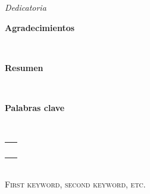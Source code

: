 \documentclass[11pt,a4paper,titlepage,twoside,openright]{report}
\begin{document}
\begin{titlepage}
\hfill \emph{Dedicatoria}
\end{titlepage}
\cleardoublepage


\begin{titlepage}
\vspace{2cm}
\begin{Huge}{\bf Agradecimientos}\end{Huge}\\
\newline



\end{titlepage}
\cleardoublepage


\begin{titlepage}
\vspace{2cm}
\begin{Huge}{\bf Resumen}\end{Huge}\\
\newline

\end{titlepage}
\cleardoublepage


\begin{titlepage}
\vspace{2cm}
\begin{Huge}{\bf Palabras clave}\end{Huge}\\
\newline

\begin{tabular}{c}
\hspace{10cm} \ \\
\end{tabular}\\
{\small \textsc{ First keyword, second keyword, etc.}}\\
\end{titlepage}
\cleardoublepage


\pagestyle{fancy}
\renewcommand{\chaptermark}[1]{\markboth{
	 \MakeUppercase{\chaptername}\ \thechapter.\ \\ {\scriptsize #1}}{}}
\renewcommand{\sectionmark}[1]{\markright{
	 {\scriptsize \thesection\  #1}}{}}
\end{document}
